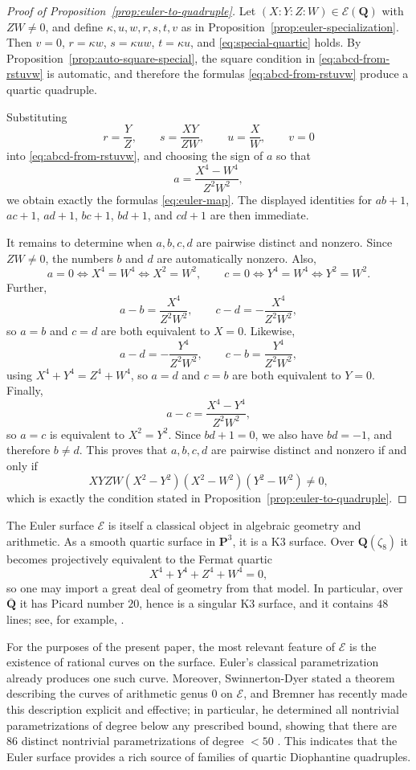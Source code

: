 \documentclass[11pt]{article}
\newcommand{\Q}{\mathbf{Q}}
\newcommand{\Pj}{\mathbf{P}}
\newcommand{\Eul}{\mathcal{E}}
\begin{document}
\begin{proof}[Proof of Proposition~\ref{prop:euler-to-quadruple}]
Let $(X:Y:Z:W)\in\Eul(\Q)$ with $ZW\neq 0$, and define $\kappa,u,w,r,s,t,v$ as in Proposition~\ref{prop:euler-specialization}. Then $v=0$, $r=\kappa w$, $s=\kappa uw$, $t=\kappa u$, and \eqref{eq:special-quartic} holds. By Proposition~\ref{prop:auto-square-special}, the square condition in \eqref{eq:abcd-from-rstuvw} is automatic, and therefore the formulas \eqref{eq:abcd-from-rstuvw} produce a quartic quadruple.

Substituting
\[
r=\frac{Y}{Z},\qquad s=\frac{XY}{ZW},\qquad u=\frac{X}{W},\qquad v=0
\]
into \eqref{eq:abcd-from-rstuvw}, and choosing the sign of $a$ so that
\[
a=\frac{X^4-W^4}{Z^2W^2},
\]
we obtain exactly the formulas \eqref{eq:euler-map}. The displayed identities for $ab+1$, $ac+1$, $ad+1$, $bc+1$, $bd+1$, and $cd+1$ are then immediate.

It remains to determine when $a,b,c,d$ are pairwise distinct and nonzero. Since $ZW\neq 0$, the numbers $b$ and $d$ are automatically nonzero. Also,
\[
a=0 \iff X^4=W^4 \iff X^2=W^2,
\qquad
c=0 \iff Y^4=W^4 \iff Y^2=W^2.
\]
Further,
\[
a-b=\frac{X^4}{Z^2W^2},
\qquad
c-d=-\frac{X^4}{Z^2W^2},
\]
so $a=b$ and $c=d$ are both equivalent to $X=0$. Likewise,
\[
a-d=-\frac{Y^4}{Z^2W^2},
\qquad
c-b=\frac{Y^4}{Z^2W^2},
\]
using $X^4+Y^4=Z^4+W^4$, so $a=d$ and $c=b$ are both equivalent to $Y=0$. Finally,
\[
a-c=\frac{X^4-Y^4}{Z^2W^2},
\]
so $a=c$ is equivalent to $X^2=Y^2$. Since $bd+1=0$, we also have $bd=-1$, and therefore $b\neq d$. This proves that $a,b,c,d$ are pairwise distinct and nonzero if and only if
\[
XYZW(X^2-Y^2)(X^2-W^2)(Y^2-W^2)\neq 0,
\]
which is exactly the condition stated in Proposition~\ref{prop:euler-to-quadruple}.
\end{proof}

The Euler surface $\Eul$ is itself a classical object in algebraic geometry and arithmetic. As a smooth quartic surface in $\Pj^3$, it is a K3 surface. Over $\Q(\zeta_8)$ it becomes projectively equivalent to the Fermat quartic
\[
X^4+Y^4+Z^4+W^4=0,
\]
so one may import a great deal of geometry from that model. In particular, over $\overline{\Q}$ it has Picard number $20$, hence is a singular K3 surface, and it contains $48$ lines; see, for example, \cite{ShiodaFermat,SchuettShiodaVanLuijk}.

For the purposes of the present paper, the most relevant feature of \(\Eul\) is the existence of rational curves on the surface. Euler's classical parametrization already produces one such curve. Moreover, Swinnerton-Dyer stated a theorem describing the curves of arithmetic genus \(0\) on \(\Eul\), and Bremner has recently made this description explicit and effective; in particular, he determined all nontrivial parametrizations of degree below any prescribed bound, showing that there are \(86\) distinct nontrivial parametrizations of degree \(<50\) \cite{SwinnertonDyerAGNT,Bremner}. This indicates that the Euler surface provides a rich source of families of quartic Diophantine quadruples.
\end{document}
